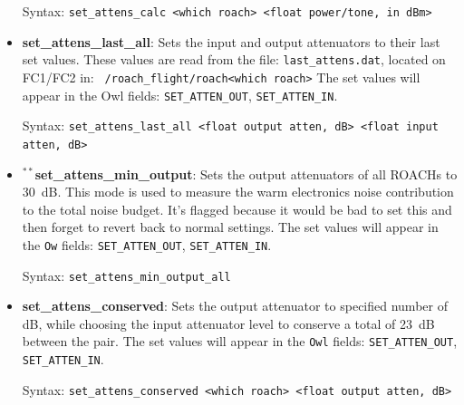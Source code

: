 \begin{itemize}[leftmargin=*,label={}]
Syntax: \texttt{set\_attens\_calc <which roach> <float power/tone, in dBm>}

\item \textbf{set\_attens\_last\_all}: Sets the input and output attenuators to their last set values. These values are read from the file: \texttt{last\_attens.dat}, located on FC1/FC2 in: \texttt{~/roach\_flight/roach<which roach>}
The set values will appear in the Owl fields: \texttt{SET\_ATTEN\_OUT}, \texttt{SET\_ATTEN\_IN}.

Syntax: \texttt{set\_attens\_last\_all <float output atten, dB> <float input atten, dB>}

\item $^{**}$\textbf{set\_attens\_min\_output}: Sets the output attenuators of all ROACHs to 30~dB. This mode is used to measure the warm electronics noise contribution to the total noise budget. It’s flagged because it would be bad to set this and then forget to revert back to normal settings. The set values will appear in the \texttt{Ow} fields: \texttt{SET\_ATTEN\_OUT}, \texttt{SET\_ATTEN\_IN}.

Syntax: \texttt{set\_attens\_min\_output\_all}

\item \textbf{set\_attens\_conserved}: Sets the output attenuator to specified number of dB, while choosing the input attenuator level to conserve a total of 23~dB between the pair. The set values will appear in the \texttt{Owl} fields: \texttt{SET\_ATTEN\_OUT}, \texttt{SET\_ATTEN\_IN}.

Syntax: \texttt{set\_attens\_conserved <which roach> <float output atten, dB>}

\end{itemize}

